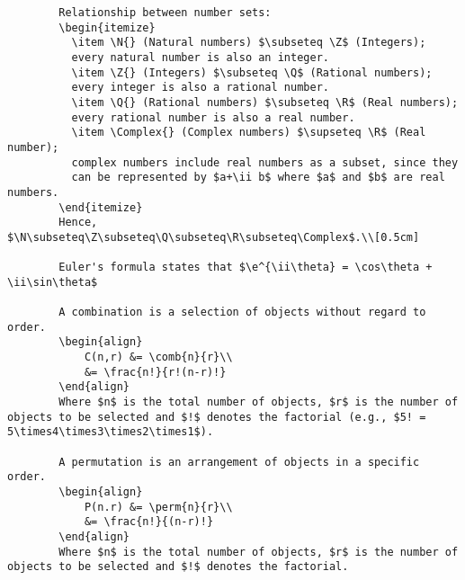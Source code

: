 \documentclass[a4paper,11pt,twoside]{article}
\begin{document}
\begin{verbatim}
        Relationship between number sets:
        \begin{itemize}
          \item \N{} (Natural numbers) $\subseteq \Z$ (Integers);
          every natural number is also an integer.
          \item \Z{} (Integers) $\subseteq \Q$ (Rational numbers);
          every integer is also a rational number.
          \item \Q{} (Rational numbers) $\subseteq \R$ (Real numbers);
          every rational number is also a real number.
          \item \Complex{} (Complex numbers) $\supseteq \R$ (Real number);
          complex numbers include real numbers as a subset, since they
          can be represented by $a+\ii b$ where $a$ and $b$ are real numbers.
        \end{itemize}
        Hence, $\N\subseteq\Z\subseteq\Q\subseteq\R\subseteq\Complex$.\\[0.5cm]

        Euler's formula states that $\e^{\ii\theta} = \cos\theta + \ii\sin\theta$

        A combination is a selection of objects without regard to order.
        \begin{align}
        	C(n,r) &= \comb{n}{r}\\
        	&= \frac{n!}{r!(n-r)!}
        \end{align}
        Where $n$ is the total number of objects, $r$ is the number of objects to be selected and $!$ denotes the factorial (e.g., $5! = 5\times4\times3\times2\times1$).

        A permutation is an arrangement of objects in a specific order.
        \begin{align}
        	P(n.r) &= \perm{n}{r}\\
        	&= \frac{n!}{(n-r)!}
        \end{align}
        Where $n$ is the total number of objects, $r$ is the number of objects to be selected and $!$ denotes the factorial.
\end{verbatim}
\end{document}
